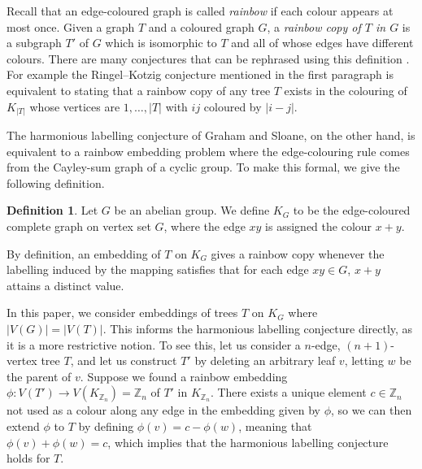 \documentclass[a4paper,11pt,hidelinks]{amsart}
\theoremstyle{definition}
\newtheorem{definition}[theorem]{Definition}
\begin{document}
\par Recall that an edge-coloured graph is called \textit{rainbow} if each colour appears at most once. Given a graph $T$ and a coloured graph $G$, a \textit{rainbow copy of $T$ in $G$} is a subgraph $T'$ of $G$ which is isomorphic to $T$ and all of whose edges have different colours. There are many conjectures that can be rephrased using this definition \cite{Pokrovskiy2022_RainbowSubgraphs}. For example the  Ringel--Kotzig conjecture mentioned in the first paragraph is equivalent to stating that a rainbow copy of any tree $T$ exists in the colouring of $K_{|T|}$ whose vertices are $1, \dots, |T|$ with $ij$ coloured by $|i-j|$.
\par The harmonious labelling conjecture of Graham and Sloane, on the other hand, is equivalent to a rainbow embedding problem where the edge-colouring rule comes from the Cayley-sum graph of a cyclic group. To make this formal, we give the following definition. \vspace{-1mm}
\begin{definition}
    Let $G$ be an abelian group. We define $K_G$ to be the edge-coloured complete graph on vertex set $G$, where the edge $xy$ is assigned the colour $x+y$. 
\end{definition}
By definition, an embedding of $T$ on $K_G$ gives a rainbow copy whenever the labelling induced by the mapping satisfies that for each edge $xy\in G$, $x+y$ attains a distinct value. 
\par In this paper, we consider embeddings of trees $T$ on $K_G$ where $|V(G)|=|V(T)|$. This informs the harmonious labelling conjecture directly, as it is a more restrictive notion. To see this, let us consider a $n$-edge, $(n+1)$-vertex tree $T$, and let us construct $T'$ by deleting an arbitrary leaf $v$, letting $w$ be the parent of $v$. Suppose we found a rainbow embedding $\phi\colon V(T')\to V(K_{\mathbb{Z}_n})=\mathbb{Z}_n$ of $T'$ in $K_{\mathbb{Z}_n}$. There exists a unique element $c\in \mathbb{Z}_n$ not used as a colour along any edge in the embedding given by $\phi$, so we can then extend $\phi$ to $T$ by defining $\phi(v)=c-\phi(w)$, meaning that $\phi(v)+\phi(w)=c$, which implies that the harmonious labelling conjecture holds for $T$. 
\end{document}
